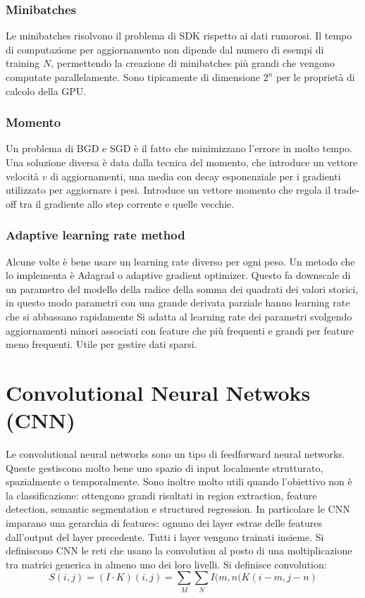 		\subsubsection{Minibatches}
		Le minibatches risolvono il problema di SDK rispetto ai dati rumorosi.
		Il tempo di computazione per aggiornamento non dipende dal numero di esempi di training $N$, permettendo la creazione di minibatches pi\`u grandi che vengono computate parallelamente.
		Sono tipicamente di dimensione $2^n$ per le propriet\`a di calcolo della GPU.

		\subsubsection{Momento}
		Un problema di BGD e SGD \`e il fatto che minimizzano l'errore in molto tempo.
		Una soluzione diversa \`e data dalla tecnica del momento, che introduce un vettore velocit\`a $v$ di aggiornamenti, una media con decay esponenziale per i gradienti utilizzato per aggiornare i pesi.
		Introduce un vettore momento che regola il trade-off tra il gradiente allo step corrente e quelle vecchie.\\
		

		\subsubsection{Adaptive learning rate method}
		Alcune volte \`e bene usare un learning rate diverso per ogni peso.
		Un metodo che lo implementa \`e Adagrad o adaptive gradient optimizer.
		Questo fa downscale di un parametro del modello della radice della somma dei quadrati dei valori storici, in questo modo parametri con una grande derivata parziale hanno learning rate che si abbassano rapidamente
		Si adatta al learning rate dei parametri svolgendo aggiornamenti minori associati con feature che pi\`u frequenti e grandi per feature meno frequenti.
		Utile per gestire dati sparsi.\\
		

\section{Convolutional Neural Netwoks (CNN)}
Le convolutional neural networks sono un tipo di feedforward neural networks.
Queste gestiscono molto bene uno spazio di input localmente strutturato, spazialmente o temporalmente.
Sono inoltre molto utili quando l'obiettivo non \`e la classificazione: ottengono grandi risultati in region extraction, feature detection, semantic segmentation e structured regression.
In particolare le CNN imparano una gerarchia di features: ognuno dei layer estrae delle features dall'output del layer precedente.
Tutti i layer vengono trainati insieme.
Si definiscono CNN le reti che usano la convolution al posto di una moltiplicazione tra matrici generica in almeno uno dei loro livelli.
Si definisce convolution:
$$S(i, j) = (I\cdot K)(i,j) = \sum\limits_M\sum\limits_NI(m,n(K(i-m,j-n)$$


